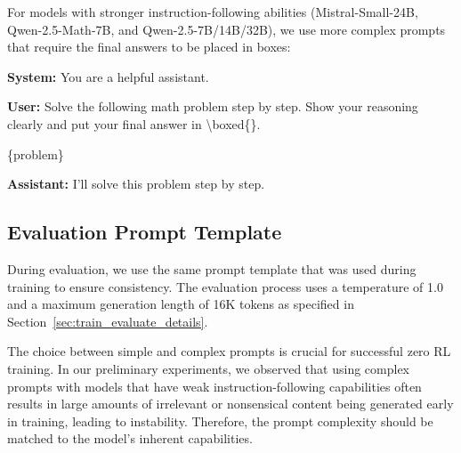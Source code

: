 For models with stronger instruction-following abilities (Mistral-Small-24B, Qwen-2.5-Math-7B, and Qwen-2.5-7B/14B/32B), we use more complex prompts that require the final answers to be placed in boxes:

\begin{tcolorbox}[
colback=lightblue!10,
colframe=lightblue!50!black,
left=2mm, right=2mm,
title=\textcolor{black}{\textbf{Complex Prompt Template}}]

\begin{small}
\textbf{System:} You are a helpful assistant.

\textbf{User:} Solve the following math problem step by step. Show your reasoning clearly and put your final answer in \textbackslash boxed\{\}.

\{problem\}

\textbf{Assistant:} I'll solve this problem step by step.
\end{small}

\end{tcolorbox}

\subsection{Evaluation Prompt Template}

During evaluation, we use the same prompt template that was used during training to ensure consistency. The evaluation process uses a temperature of 1.0 and a maximum generation length of 16K tokens as specified in Section~\ref{sec:train_evaluate_details}.

\begin{tcolorbox}[
colback=lightblue!10,
colframe=lightblue!50!black,
left=2mm, right=2mm,
title=\textcolor{black}{\textbf{Note on Prompt Selection}}]

\begin{small}
The choice between simple and complex prompts is crucial for successful zero RL training. In our preliminary experiments, we observed that using complex prompts with models that have weak instruction-following capabilities often results in large amounts of irrelevant or nonsensical content being generated early in training, leading to instability. Therefore, the prompt complexity should be matched to the model's inherent capabilities.
\end{small}

\end{tcolorbox}